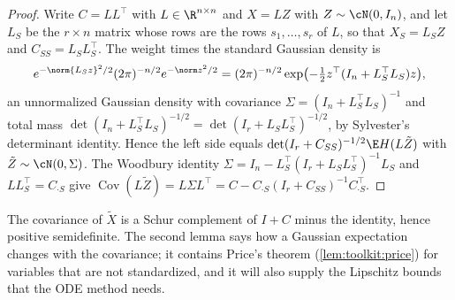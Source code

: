 \begin{refsection}
\begin{proof}
Write $C=LL^\top$ with $L\in\R^{n\times n}$ and $X=LZ$ with $Z\sim\cN(0,I_n)$, and let $L_S$ be the $r\times n$ matrix whose rows are the rows $s_1,\dots,s_r$ of $L$, so that $X_S=L_SZ$ and $C_{SS}=L_SL_S^\top$. The weight times the standard Gaussian density is
\[
  e^{-\norm{L_Sz}^2/2}(2\pi)^{-n/2}e^{-\norm z^2/2}=(2\pi)^{-n/2}\exp\bigl(-\tfrac12z^\top(I_n+L_S^\top L_S)z\bigr),
\]
an unnormalized Gaussian density with covariance $\Sigma=(I_n+L_S^\top L_S)^{-1}$ and total mass $\det(I_n+L_S^\top L_S)^{-1/2}=\det(I_r+L_SL_S^\top)^{-1/2}$, by Sylvester's determinant identity. Hence the left side equals $\det(I_r+C_{SS})^{-1/2}\E H(L\tilde Z)$ with $\tilde Z\sim\cN(0,\Sigma)$. The Woodbury identity $\Sigma=I_n-L_S^\top(I_r+L_SL_S^\top)^{-1}L_S$ and $LL_S^\top=C_{\cdot S}$ give $\operatorname{Cov}(L\tilde Z)=L\Sigma L^\top=C-C_{\cdot S}(I_r+C_{SS})^{-1}C_{\cdot S}^\top$.
\end{proof}

The covariance of $\tilde X$ is a Schur complement of $I+C$ minus the identity, hence positive semidefinite. The second lemma says how a Gaussian expectation changes with the covariance; it contains Price's theorem (\cref{lem:toolkit:price}) for variables that are not standardized, and it will also supply the Lipschitz bounds that the ODE method needs.



\end{refsection}
